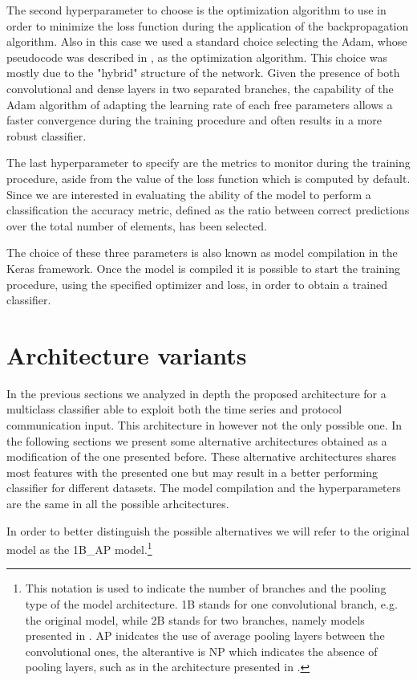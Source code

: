 The second hyperparameter to choose is the optimization algorithm to use in order to minimize the loss function during the application of the backpropagation algorithm. Also in this case we used a standard choice selecting the Adam, whose pseudocode was described in , as the optimization algorithm. This choice was mostly due to the "hybrid" structure of the network. Given the presence of both convolutional and dense layers in two separated branches, the capability of the Adam algorithm of adapting the learning rate of each free parameters allows a faster convergence during the training procedure and often results in a more robust classifier.

The last hyperparameter to specify are the metrics to monitor during the training procedure, aside from the value of the loss function which is computed by default. Since we are interested in evaluating the ability of the model to perform a classification the accuracy metric, defined as the ratio between correct predictions over the total number of elements, has been selected. 

The choice of these three parameters is also known as model compilation in the Keras framework. Once the model is compiled it is possible to start the training procedure, using the specified optimizer and loss, in order to obtain a trained classifier.

\section{Architecture variants} \label{modelalt}

In the previous sections we analyzed in depth the proposed architecture for a multiclass classifier able to exploit both the time series and protocol communication input. This architecture in however not the only possible one. In the following sections we present some alternative architectures obtained as a modification of the one presented before. These alternative architectures shares most features with the presented one but may result in a better performing classifier for different datasets. The model compilation and the hyperparameters are the same in all the possible arhcitectures. 

In order to better distinguish the possible alternatives we will refer to the original model as the 1B\_AP model.\footnote{This notation is used to indicate the number of branches and the pooling type of the model architecture. 1B stands for one convolutional branch, e.g. the original model, while 2B stands for two branches, namely models presented in . AP inidcates the use of average pooling layers between the convolutional ones, the alterantive is NP which indicates the absence of pooling layers, such as in the architecture presented in .  }

